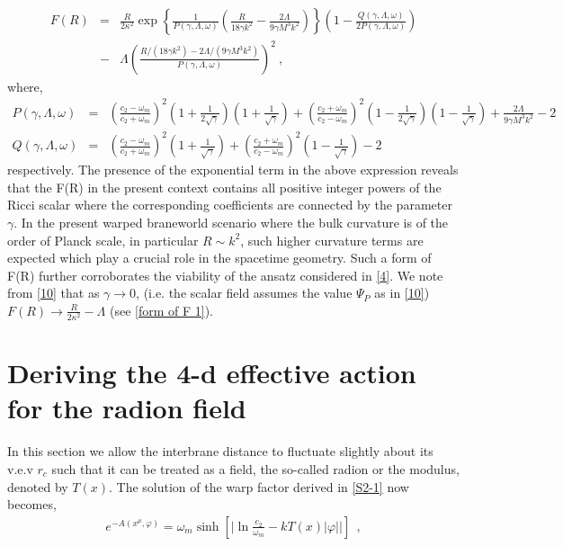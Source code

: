\documentclass{article}
\begin{document}
\begin{eqnarray}
 F(R)&=&\frac{R}{2\kappa^2}
 \exp{\left\{\frac{1}{P\left(\gamma,\Lambda,\omega\right)}\left(\frac{R}{18\gamma k^2} - \frac{2\Lambda}{9\gamma M^3k^2}\right)\right\}}
 \left(1 - \frac{Q\left(\gamma,\Lambda,\omega\right)}{2P\left(\gamma,\Lambda,\omega\right)}\right)\nonumber\\ 
 &-&\Lambda\left(\frac{R/\left(18\gamma k^2\right) - 2\Lambda/\left(9\gamma M^3k^2\right)}{P\left(\gamma,\Lambda,\omega\right)}\right)^2~,
 \label{form of F 4}
\end{eqnarray}
where,
\begin{eqnarray}
 P\left(\gamma,\Lambda,\omega\right)&=&\left(\frac{c_2 - \omega_m}{c_2 + \omega_m}\right)^2\left(1 + \frac{1}{2\sqrt{\gamma}}\right)\left(1 + \frac{1}{\sqrt{\gamma}}\right) 
 + \left(\frac{c_2 + \omega_m}{c_2 - \omega_m}\right)^2\left(1 - \frac{1}{2\sqrt{\gamma}}\right)\left(1 - \frac{1}{\sqrt{\gamma}}\right) 
 + \frac{2\Lambda}{9\gamma M^3k^2} - 2\nonumber\\
 Q\left(\gamma,\Lambda,\omega\right)&=&\left(\frac{c_2 - \omega_m}{c_2 + \omega_m}\right)^2\left(1 + \frac{1}{\sqrt{\gamma}}\right) 
 + \left(\frac{c_2 + \omega_m}{c_2 - \omega_m}\right)^2\left(1 - \frac{1}{\sqrt{\gamma}}\right) - 2
 \label{P and Q}
\end{eqnarray}
respectively. 
The presence of the exponential term in the above expression reveals that the F(R) in the present context contains all positive integer powers of the Ricci 
scalar where the corresponding coefficients are connected by the parameter $\gamma$. In the present warped braneworld scenario where the bulk curvature is 
of the order of Planck scale, in particular $R \sim k^2$, such higher curvature terms are expected which play a crucial role in the spacetime geometry. Such a form of F(R) further corroborates the viability of the ansatz considered in \ref{4}. We note from \ref{10} that as $\gamma\to 0$, (i.e. the scalar field assumes the value $\Psi_P$ as in \ref{10}) $F(R)\to\frac{R}{2\kappa^2}-\Lambda$ (see \ref{form of F 1}).



\section{Deriving the 4-d effective action for the radion field}
\label{S3}
In this section we allow the interbrane distance to fluctuate slightly about its v.e.v $r_c$ such that it can be treated as a field, the so-called radion or the modulus, denoted by $T(x)$. The solution of the warp factor derived in \ref{S2-1} now becomes,
\begin{eqnarray}
 e^{-A(x^\mu,\varphi)} = \omega_m\sinh\left[\Big|\ln{\frac{c_2}{\omega_m}} - kT(x)|\varphi|\Big|\right]~~,
 \label{6-a}
\end{eqnarray}
 
\end{document}
